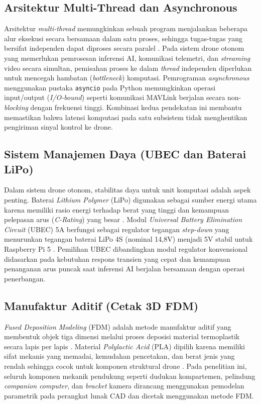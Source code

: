 \subsection{Arsitektur Multi-Thread dan Asynchronous}
Arsitektur \textit{multi-thread} memungkinkan sebuah program menjalankan beberapa alur eksekusi secara bersamaan dalam satu proses, sehingga tugas-tugas yang bersifat independen dapat diproses secara paralel \cite{Tanenbaum2023OperatingSystems}. Pada sistem drone otonom yang memerlukan pemrosesan inferensi AI, komunikasi telemetri, dan \textit{streaming} video secara simultan, pemisahan proses ke dalam \textit{thread} independen diperlukan untuk mencegah hambatan (\textit{bottleneck}) komputasi. Pemrograman \textit{asynchronous} menggunakan pustaka \texttt{asyncio} pada Python memungkinkan operasi input/output (\textit{I/O-bound}) seperti komunikasi MAVLink berjalan secara non-\textit{blocking} dengan frekuensi tinggi. Kombinasi kedua pendekatan ini membantu memastikan bahwa latensi komputasi pada satu subsistem tidak menghentikan pengiriman sinyal kontrol ke drone.

\subsection{Sistem Manajemen Daya (UBEC dan Baterai LiPo)}
Dalam sistem drone otonom, stabilitas daya untuk unit komputasi adalah aspek penting. Baterai \textit{Lithium Polymer} (LiPo) digunakan sebagai sumber energi utama karena memiliki rasio energi terhadap berat yang tinggi dan kemampuan pelepasan arus (\textit{C-Rating}) yang besar \cite{Traub2011BatteryPowered}. Modul \textit{Universal Battery Elimination Circuit} (UBEC) 5A berfungsi sebagai regulator tegangan \textit{step-down} yang menurunkan tegangan baterai LiPo 4S (nominal 14,8V) menjadi 5V stabil untuk Raspberry Pi 5 \cite{mcnulty2022_liion_review}. Pemilihan UBEC dibandingkan modul regulator konvensional didasarkan pada kebutuhan respons transien yang cepat dan kemampuan penanganan arus puncak saat inferensi AI berjalan bersamaan dengan operasi penerbangan.

\subsection{Manufaktur Aditif (Cetak 3D FDM)}
\textit{Fused Deposition Modeling} (FDM) adalah metode manufaktur aditif yang membentuk objek tiga dimensi melalui proses deposisi material termoplastik secara lapis per lapis \cite{Ngo2018AdditiveManufacturing}. Material \textit{Polylactic Acid} (PLA) dipilih karena memiliki sifat mekanis yang memadai, kemudahan pencetakan, dan berat jenis yang rendah sehingga cocok untuk komponen struktural drone \cite{Farah2016PLA}. Pada penelitian ini, seluruh komponen mekanik pendukung seperti dudukan kompartemen, pelindung \textit{companion computer}, dan \textit{bracket} kamera dirancang menggunakan pemodelan parametrik pada perangkat lunak CAD dan dicetak menggunakan metode FDM.

